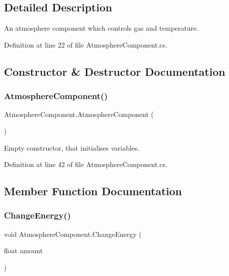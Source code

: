 \subsection{Detailed Description}
An atmosphere component which controls gas and temperature. 



Definition at line 22 of file Atmosphere\+Component.\+cs.



\subsection{Constructor \& Destructor Documentation}
\mbox{\label{class_atmosphere_component_aa1d8f0e689d42f6ae5663473406db9be}} 
\subsubsection{\texorpdfstring{Atmosphere\+Component()}{AtmosphereComponent()}}
{\footnotesize\ttfamily Atmosphere\+Component.\+Atmosphere\+Component (\begin{DoxyParamCaption}{ }\end{DoxyParamCaption})}



Empty constructor, that initialises variables. 



Definition at line 42 of file Atmosphere\+Component.\+cs.



\subsection{Member Function Documentation}
\mbox{\label{class_atmosphere_component_a00e0f048f19f2fd4c93cd4b4958c26c3}} 
\subsubsection{\texorpdfstring{Change\+Energy()}{ChangeEnergy()}}
{\footnotesize\ttfamily void Atmosphere\+Component.\+Change\+Energy (\begin{DoxyParamCaption}\item[{float}]{amount }\end{DoxyParamCaption})}




